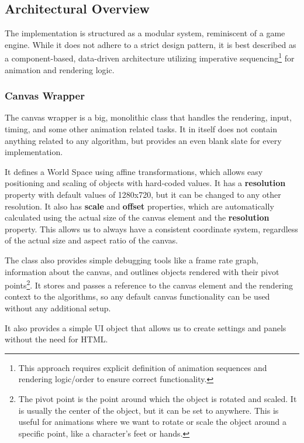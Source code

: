 \pagebreak

\subsection{Architectural Overview}
\label{subsec:architectural-overview}

The implementation is structured as a modular system, reminiscent of a game engine. While it does not adhere to a strict design pattern, it is best described as a component-based, data-driven architecture utilizing imperative sequencing\footnote{This approach requires explicit definition of animation sequences and rendering logic/order to ensure correct functionality.} for animation and rendering logic.

\subsubsection{Canvas Wrapper}
\label{subsubsec:canvas-wrapper}

The canvas wrapper is a big, monolithic class that handles the rendering, input, timing, and some other animation related tasks. It in itself does not contain anything related to any algorithm, but provides an even blank slate for every implementation.

It defines a World Space using affine transformations, which allows easy positioning and scaling of objects with hard-coded values. It has a \textbf{resolution} property with default values of 1280x720, but it can be changed to any other resolution. It also has \textbf{scale} and \textbf{offset} properties, which are automatically calculated using the actual size of the canvas element and the \textbf{resolution} property. This allows us to always have a consistent coordinate system, regardless of the actual size and aspect ratio of the canvas.

The class also provides simple debugging tools like a frame rate graph, information about the canvas, and outlines objects rendered with their pivot points\footnote{The pivot point is the point around which the object is rotated and scaled. It is usually the center of the object, but it can be set to anywhere. This is useful for animations where we want to rotate or scale the object around a specific point, like a character's feet or hands.}. It stores and passes a reference to the canvas element and the rendering context to the algorithms, so any default canvas functionality can be used without any additional setup.

It also provides a simple UI object that allows us to create settings and panels without the need for HTML.

